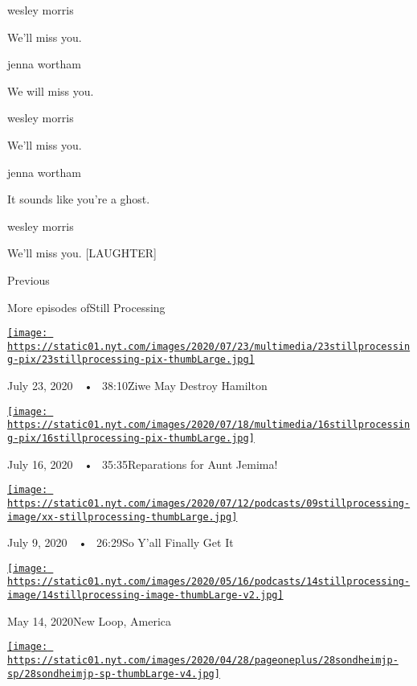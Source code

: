 wesley morris

We'll miss you.

jenna wortham

We will miss you.

wesley morris

We'll miss you.

jenna wortham

It sounds like you're a ghost.

wesley morris

We'll miss you. {[}LAUGHTER{]}

Previous

More episodes ofStill Processing

\href{https://www.nytimes.com/2020/07/23/podcasts/hamilton-ziwe-discomfort.html?action=click\&module=audio-series-bar\&region=header\&pgtype=Article}{\texttt{[image: https://static01.nyt.com/images/2020/07/23/multimedia/23stillprocessing-pix/23stillprocessing-pix-thumbLarge.jpg]}}

July 23, 2020~~•~ 38:10Ziwe May Destroy Hamilton

\href{https://www.nytimes.com/2020/07/16/podcasts/reparations-for-aunt-jemima.html?action=click\&module=audio-series-bar\&region=header\&pgtype=Article}{\texttt{[image: https://static01.nyt.com/images/2020/07/18/multimedia/16stillprocessing-pix/16stillprocessing-pix-thumbLarge.jpg]}}

July 16, 2020~~•~ 35:35Reparations for Aunt Jemima!

\href{https://www.nytimes.com/2020/07/09/podcasts/still-processing-black-lives-matter.html?action=click\&module=audio-series-bar\&region=header\&pgtype=Article}{\texttt{[image: https://static01.nyt.com/images/2020/07/12/podcasts/09stillprocessing-image/xx-stillprocessing-thumbLarge.jpg]}}

July 9, 2020~~•~ 26:29So Y'all Finally Get It

\href{https://www.nytimes.com/2020/05/14/podcasts/still-processing-westworld-hollywood-utopia-dystopia.html?action=click\&module=audio-series-bar\&region=header\&pgtype=Article}{\texttt{[image: https://static01.nyt.com/images/2020/05/16/podcasts/14stillprocessing-image/14stillprocessing-image-thumbLarge-v2.jpg]}}

May 14, 2020New Loop, America

\href{https://www.nytimes.com/2020/05/07/podcasts/still-processing-internet-vulnerability-sondheim-parks-recreation.html?action=click\&module=audio-series-bar\&region=header\&pgtype=Article}{\texttt{[image: https://static01.nyt.com/images/2020/04/28/pageoneplus/28sondheimjp-sp/28sondheimjp-sp-thumbLarge-v4.jpg]}}

